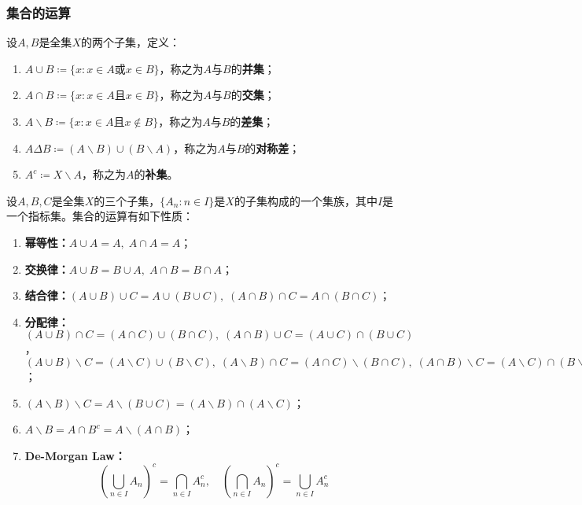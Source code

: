 \subsubsection{集合的运算}
\begin{definition}
	设$A,B$是全集$X$的两个子集，定义：
	\begin{enumerate}
		\item $A\cup B\coloneq\{x:x\in A\text{或}x\in B\}$，称之为$A$与$B$的\textbf{并集}；
		\item $A\cap B\coloneq\{x:x\in A\text{且}x\in B\}$，称之为$A$与$B$的\textbf{交集}；
		\item $A\backslash B\coloneq\{x:x\in A\text{且}x\notin B\}$，称之为$A$与$B$的\textbf{差集}；
		\item $A\Delta B\coloneq (A\backslash B)\cup(B\backslash A)$，称之为$A$与$B$的\textbf{对称差}；
		\item $A^c\coloneq X\backslash A$，称之为$A$的\textbf{补集}。
	\end{enumerate}
\end{definition}
\begin{property}\label{prop:SetOperation}
	设$A,B,C$是全集$X$的三个子集，$\{A_n:n\in I\}$是$X$的子集构成的一个集族，其中$I$是一个指标集。集合的运算有如下性质：
	\begin{enumerate}
		\item \textbf{幂等性：}$A\cup A=A,\;A\cap A=A$；
		\item \textbf{交换律：}$A\cup B=B\cup A,\;A\cap B=B\cap A$；
		\item \textbf{结合律：}$(A\cup B)\cup C=A\cup(B\cup C),\;(A\cap B)\cap C=A\cap(B\cap C)$；
		\item \textbf{分配律：}$(A\cup B)\cap C=(A\cap C)\cup(B\cap C),\;(A\cap B)\cup C=(A\cup C)\cap(B\cup C)$，$(A\cup B)\backslash C=(A\backslash C)\cup(B\backslash C),\;(A\backslash B)\cap C=(A\cap C)\backslash(B\cap C),\;(A\cap B)\backslash C=(A\backslash C)\cap(B\backslash C)$；
		\item $(A\backslash B)\backslash C=A\backslash(B\cup C)=(A\backslash B)\cap(A\backslash C)$；
		\item $A\backslash B=A\cap B^c=A\backslash (A\cap B)$；
		\item \textbf{De-Morgan Law：}
		\begin{equation*}
			\left(\underset{n\in I}{\bigcup}A_n\right)^c=\underset{n\in I}{\bigcap}A_n^c,\quad
			\left(\underset{n\in I}{\bigcap}A_n\right)^c=\underset{n\in I}{\bigcup}A_n^c
		\end{equation*}
	\end{enumerate}
\end{property}
